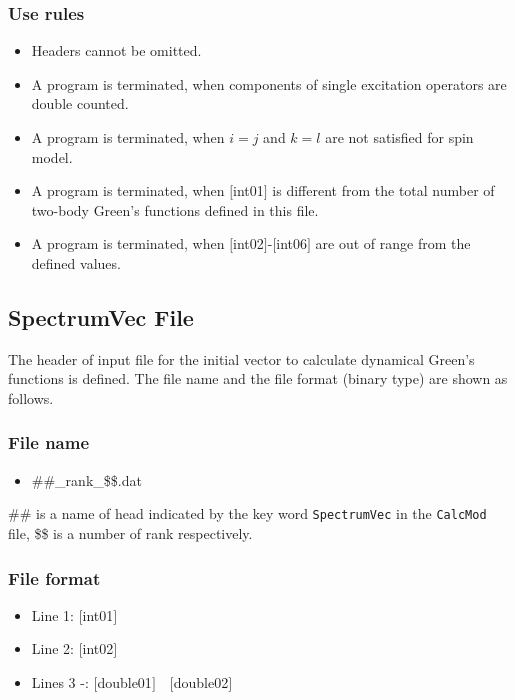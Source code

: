 \subsubsection{Use rules}
\begin{itemize}
\item Headers cannot be omitted. 
\item A program is terminated, when components of single excitation operators are double counted.
\item {A program is terminated, when $i=j$ and $k=l$ are not satisfied for spin model.}
\item A program is terminated, when $[$int01$]$ is different from the total number of two-body Green's functions defined in this file.
\item A program is terminated, when $[$int02$]$-$[$int06$]$ are out of range from the defined values.
\end{itemize}

\newpage
\subsection{{SpectrumVec File}}
\label{Subsec:spectrumvec}
The header of input file for the initial vector to calculate dynamical Green's functions is defined.
The file name and the file format (binary type) are shown as follows.

\subsubsection{File name}
\begin{itemize}
   \item{\#\#\_rank\_\$\$.dat}   
\end{itemize}
  \#\# is a name of head indicated by the key word \verb|SpectrumVec| in the  \verb|CalcMod| file, \$\$  is a number of rank respectively.

\subsubsection{File format}
 \begin{itemize}
   \item  Line 1: $[$int01$]$
   \item  Line 2: $[$int02$]$
   \item  Lines 3 -: $[$double01$]$~~$[$double02$]$
  \end{itemize}
  
